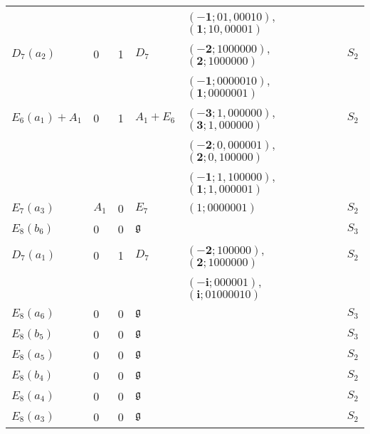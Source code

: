 \documentclass[a4paper,10pt]{amsart}
\newcommand{\mf}{\mathfrak}
\newcommand{\g}{\mf{g}}
\newcommand{\wts}[2]{{({\scriptstyle{#1}};{\scriptstyle{#2}})}}
\numberwithin{equation}{section}
\theoremstyle{remark}
\theoremstyle{remark}
\begin{document}
\begin{longtable}{|l|l|l|l|l|l|}
&&&&  $\wts{\mathbf{-1}}{01,00010}$, $\wts{\mathbf{1}}{10,00001}$ &\\
$D_7(a_2)$ & 0 & 1  & $D_7$ & $\wts{\mathbf{-2}}{1000000}$, $\wts{\mathbf{2}}{1000000}$ & $S_2$\\
&&&& $\wts{\mathbf{-1}}{0000010}$, $\wts{\mathbf{1}}{0000001}$ &\\
$E_6(a_1)+A_1$ & 0 &  1 & $A_1+E_6$ & $\wts{\mathbf{-3}}{1,000000}$, $\wts{\mathbf{3}}{1,000000}$ & $S_2$\\
&&&&  $\wts{\mathbf{-2}}{0,000001}$, $\wts{\mathbf{2}}{0,100000}$ & \\
&&&&  $\wts{\mathbf{-1}}{1,100000}$, $\wts{\mathbf{1}}{1,000001}$ & \\
$E_7(a_3)$ & $A_1$ & 0 & $E_7$ & $\wts{1}{0000001}$ & $S_2$\\
$E_8(b_6)$ & 0 & 0 & $\g$ & & $S_3$\\
$D_7(a_1)$ & 0 & 1 & $D_7$ & $\wts{\mathbf{-2}}{100000}$, $\wts{\mathbf{2}}{1000000}$ &  $S_2$\\
&&&&  $\wts{\mathbf{-i}}{000001}$, $\wts{\mathbf{i}}{01000010}$ & \\
$E_8(a_6)$ & 0 & 0 & $\g$ & & $S_3$\\
$E_8(b_5)$ & 0 & 0 & $\g$ & & $S_3$\\
$E_8(a_5)$ & 0 & 0 & $\g$ & & $S_2$\\
$E_8(b_4)$ & 0 & 0 & $\g$ & & $S_2$\\
$E_8(a_4)$ & 0 & 0 & $\g$ & & $S_2$\\
$E_8(a_3)$ & 0 & 0 & $\g$ & & $S_2$\\
\hline  
\end{longtable}


%
%
\end{document}
